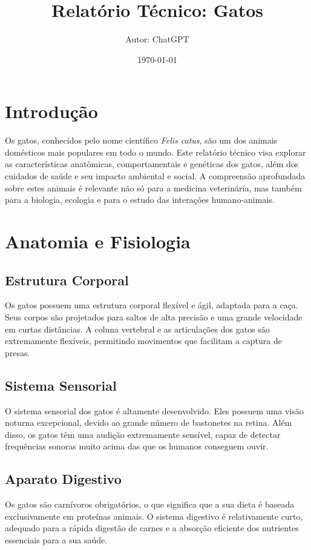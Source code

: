 \documentclass[a4paper,12pt]{report}
\title{Relatório Técnico: Gatos}
\author{Autor: ChatGPT}
\date{\today}
\begin{document}
\maketitle

\tableofcontents
\newpage

\chapter{Introdução}
Os gatos, conhecidos pelo nome científico \textit{Felis catus}, são um dos animais domésticos mais populares em todo o mundo. Este relatório técnico visa explorar as características anatômicas, comportamentais e genéticas dos gatos, além dos cuidados de saúde e seu impacto ambiental e social. A compreensão aprofundada sobre estes animais é relevante não só para a medicina veterinária, mas também para a biologia, ecologia e para o estudo das interações humano-animais.

\chapter{Anatomia e Fisiologia}
\section{Estrutura Corporal}
Os gatos possuem uma estrutura corporal flexível e ágil, adaptada para a caça. Seus corpos são projetados para saltos de alta precisão e uma grande velocidade em curtas distâncias. A coluna vertebral e as articulações dos gatos são extremamente flexíveis, permitindo movimentos que facilitam a captura de presas.

\section{Sistema Sensorial}
O sistema sensorial dos gatos é altamente desenvolvido. Eles possuem uma visão noturna excepcional, devido ao grande número de bastonetes na retina. Além disso, os gatos têm uma audição extremamente sensível, capaz de detectar frequências sonoras muito acima das que os humanos conseguem ouvir.

\section{Aparato Digestivo}
Os gatos são carnívoros obrigatórios, o que significa que a sua dieta é baseada exclusivamente em proteínas animais. O sistema digestivo é relativamente curto, adequado para a rápida digestão de carnes e a absorção eficiente dos nutrientes essenciais para a sua saúde.
\end{document}
